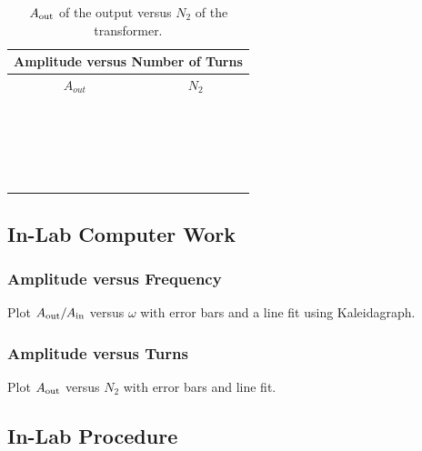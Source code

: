 \begin{table}[htb]
\begin{center}
\begin{tabular}{|c|c|}
\hline
\multicolumn{2}{|c|}{Amplitude versus Number of Turns}\\
\hline
$A_{out}$ & $N_2$ \\
\hline
\hspace*{5cm} & \hspace*{5cm}  \\
& \\
\hline       
& \\
& \\
\hline
& \\
& \\
\hline
& \\
& \\
\hline
& \\
& \\
\hline
& \\
& \\
\hline
& \\
& \\
\hline
& \\
& \\
\hline
& \\
& \\
\hline
& \\
& \\
\hline
\end{tabular}
\end{center}
\caption{$A_{\rm{out}}$ of the output versus $N_2$ of the transformer.}
\label{tab:in:AvsN}
\end{table}

\subsection{In-Lab Computer Work}
\subsubsection{Amplitude versus Frequency}
Plot $A_{\rm{out}}/A_{\rm{in}}$ versus $\omega$ with 
error bars and a line fit using Kaleidagraph. 

\subsubsection{Amplitude versus Turns}
Plot $A_{\rm{out}}$ 
versus $N_2$ with error bars and line fit.

\subsection{In-Lab Procedure}
